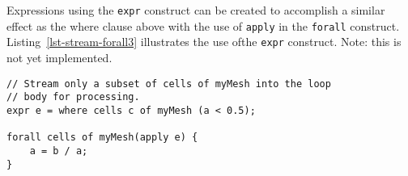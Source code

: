 Expressions using the \texttt{expr} construct can be created to accomplish a similar effect as the
where clause above with the use of \texttt{apply} in the \texttt{forall} construct.  
Listing~\ref{lst-stream-forall3} illustrates the use ofthe \texttt{expr} construct.
Note:  this is not yet implemented.

\par\bigskip
\begin{lstlisting}[float=h,label=lst-stream-forall3,
	caption={Streaming \texttt{forall} loop construct using \texttt{expr}.}]
// Stream only a subset of cells of myMesh into the loop
// body for processing. 
expr e = where cells c of myMesh (a < 0.5);

forall cells of myMesh(apply e) { 
	a = b / a;
}
\end{lstlisting}
\par\bigskip\noindent

